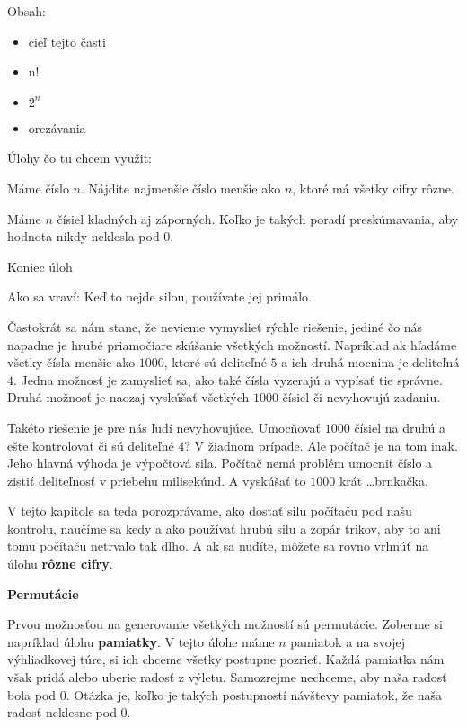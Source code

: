 




Obsah:
\begin{itemize}
    \item cieľ tejto časti
    \item n!
    \item $2^n$
    \item orezávania
\end{itemize}

Úlohy čo tu chcem využit:

Máme číslo $n$. Nájdite najmenšie číslo menšie ako $n$, ktoré má všetky cifry rôzne.

Máme $n$ čísiel kladných aj záporných. Koľko je takých poradí preskúmavania, aby hodnota nikdy
neklesla pod 0.

Koniec úloh

Ako sa vraví: Keď to nejde silou, používate jej primálo.

Častokrát sa nám stane, že nevieme vymyslieť rýchle riešenie, jediné čo nás napadne je hrubé
priamočiare skúšanie všetkých možností. Napríklad ak hľadáme všetky čísla menšie ako $1000$, ktoré
sú deliteľné $5$ a ich druhá mocnina je deliteľná $4$. Jedna možnosť je zamyslieť sa, ako také čísla
vyzerajú a vypísať tie správne. Druhá možnosť je naozaj vyskúšať všetkých $1000$ čísiel či
nevyhovujú zadaniu.

Takéto riešenie je pre nás ľudí nevyhovujúce. Umocňovať $1000$ čísiel na druhú a ešte kontrolovať či
sú deliteľné $4$? V žiadnom prípade. Ale počítač je na tom inak. Jeho hlavná výhoda je výpočtová
sila. Počítač nemá problém umocniť číslo a zistiť deliteľnosť v priebehu milisekúnd. A vyskúšať to
$1000$ krát \dots brnkačka.

V tejto kapitole sa teda porozprávame, ako dostať silu počítaču pod našu kontrolu, naučíme sa kedy a
ako používať hrubú silu a zopár trikov, aby to ani tomu počítaču netrvalo tak dlho. A ak sa nudíte,
môžete sa rovno vrhnúť na úlohu \textbf{rôzne cifry}.

\textbf{Permutácie}

Prvou možnosťou na generovanie všetkých možností sú permutácie. Zoberme si napríklad úlohu
\textbf{pamiatky}. V tejto úlohe máme $n$ pamiatok a na svojej výhliadkovej túre, si ich chceme
všetky postupne pozrieť. Každá pamiatka nám však pridá alebo uberie radosť z výletu. Samozrejme
nechceme, aby naša radosť bola pod $0$. Otázka je, koľko je takých postupností návštevy pamiatok, že
naša radosť neklesne pod $0$.

